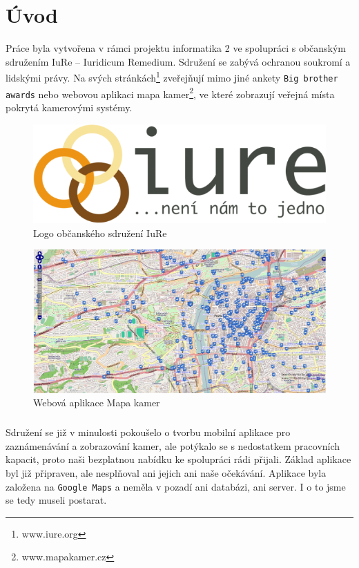 \chapter{Úvod}
Práce byla vytvořena v rámci projektu informatika 2 ve spolupráci s občanským sdružením IuRe -- Iuridicum Remedium. Sdružení se zabývá ochranou soukromí a lidskými právy. Na svých stránkách\footnote{www.iure.org} zveřejňují mimo jiné  ankety \texttt{Big brother awards} nebo webovou aplikaci mapa kamer\footnote{www.mapakamer.cz}, ve které zobrazují veřejná místa pokrytá kamerovými systémy. 
\begin{figure}[hb]
\begin{center}
\includegraphics[scale=0.3]{pics/iure_logo.png}
\caption{Logo občanského sdružení IuRe}
\end{center}
\end{figure}
\begin{figure}[hb]
\begin{center}
\includegraphics[scale=0.3]{pics/mapakamer.jpg}
\caption{Webová aplikace Mapa kamer}
\end{center}
\end{figure}
\paragraph{}
Sdružení se již v minulosti pokoušelo o tvorbu mobilní aplikace pro zaznámenávání a zobrazování kamer, ale potýkalo se s nedostatkem pracovních kapacit, proto naši bezplatnou nabídku ke spolupráci rádi přijali. Základ aplikace byl již připraven, ale nespl\v{n}oval ani jejich ani naše očekávání. Aplikace byla založena na \texttt{Google Maps} a neměla v pozadí ani databázi, ani server. I o to jsme se tedy museli postarat. 
